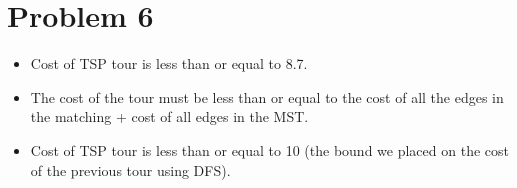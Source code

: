 \documentclass[11pt]{article}
\begin{document}
\section*{Problem 6}
\label{sec:orga9ea1a4}
\begin{itemize}
\item Cost of TSP tour is less than or equal to 8.7.
\item The cost of the tour must be less than or equal to the cost of all the edges
in the matching + cost of all edges in the MST.
\item Cost of TSP tour is less than or equal to 10 (the bound we placed on the cost
of the previous tour using DFS).
\end{itemize}
\end{document}
